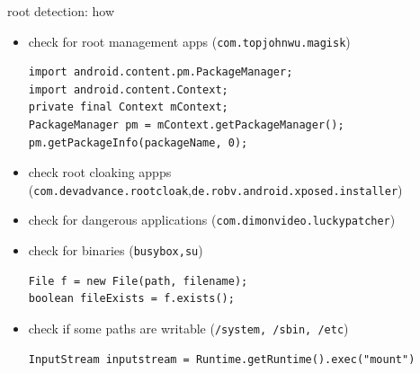 \documentclass{beamer}
\begin{document}
    


\begin{frame}[fragile]{root detection: how}

    \begin{itemize}
        \item check for root management apps (\texttt{com.topjohnwu.magisk})
\begin{verbatim}
import android.content.pm.PackageManager;
import android.content.Context;
private final Context mContext;
PackageManager pm = mContext.getPackageManager();
pm.getPackageInfo(packageName, 0);
\end{verbatim}
        \item check root cloaking appps {\small (\texttt{com.devadvance.rootcloak},\texttt{de.robv.android.xposed.installer})}
        \item check for dangerous applications (\texttt{com.dimonvideo.luckypatcher})
        \item check for binaries (\texttt{busybox,su})
\begin{verbatim}
File f = new File(path, filename);
boolean fileExists = f.exists();
\end{verbatim}
        \item check if some paths are writable (\texttt{/system, /sbin, /etc})
\begin{verbatim}
InputStream inputstream = Runtime.getRuntime().exec("mount")
\end{verbatim}
    \end{itemize}

\end{frame}
\end{document}
